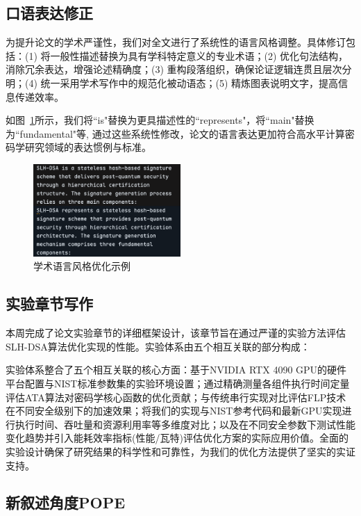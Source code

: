 \documentclass{article}
\begin{document}
\subsection{口语表达修正}

为提升论文的学术严谨性，我们对全文进行了系统性的语言风格调整。具体修订包括：(1) 将一般性描述替换为具有学科特定意义的专业术语；(2) 优化句法结构，消除冗余表达，增强论述精确度；(3) 重构段落组织，确保论证逻辑连贯且层次分明；(4) 统一采用学术写作中的规范化被动语态；(5) 精炼图表说明文字，提高信息传递效率。

如图~\ref{fig:example}所示，我们将``is"替换为更具描述性的``represents"，将``main"替换为``fundamental"等, 通过这些系统性修改，论文的语言表达更加符合高水平计算密码学研究领域的表达惯例与标准。

\begin{figure}[htbp]
\centering
\includegraphics[width=0.5\textwidth]{./fig/fix_writing.png}
\caption{学术语言风格优化示例}
\label{fig:example}
\end{figure}

\subsection{实验章节写作}
本周完成了论文实验章节的详细框架设计，该章节旨在通过严谨的实验方法评估SLH-DSA算法优化实现的性能。实验体系由五个相互关联的部分构成：

实验体系整合了五个相互关联的核心方面：基于NVIDIA RTX 4090 GPU的硬件平台配置与NIST标准参数集的实验环境设置；通过精确测量各组件执行时间定量评估ATA算法对密码学核心函数的优化贡献；与传统串行实现对比评估FLP技术在不同安全级别下的加速效果；将我们的实现与NIST参考代码和最新GPU实现进行执行时间、吞吐量和资源利用率等多维度对比；以及在不同安全参数下测试性能变化趋势并引入能耗效率指标(性能/瓦特)评估优化方案的实际应用价值。全面的实验设计确保了研究结果的科学性和可靠性，为我们的优化方法提供了坚实的实证支持。

\subsection{新叙述角度POPE}
\end{document}
